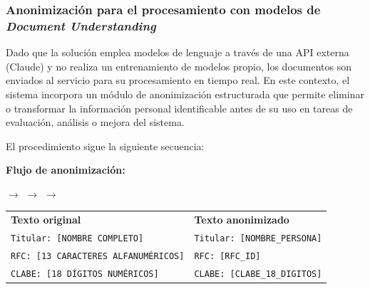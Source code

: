 \subsubsection{Anonimización para el procesamiento con modelos de \textit{Document Understanding}}

Dado que la solución emplea modelos de lenguaje a través de una API externa (Claude) y no realiza un entrenamiento de modelos propio, los documentos son enviados al servicio para su procesamiento en tiempo real. En este contexto, el sistema incorpora un módulo de anonimización estructurada \cite{google_docunderstanding} que permite eliminar o transformar la información personal identificable antes de su uso en tareas de evaluación, análisis o mejora del sistema.

El procedimiento sigue la siguiente secuencia:
\begin{tcolorbox}[
    colback=gray!5,
    colframe=gray!50,
    title={Proceso de anonimización implementado},
    fonttitle=\bfseries,
    sharp corners,
    boxrule=0.5pt
]
\small

\textbf{Flujo de anonimización:}

\begin{center}
$\rightarrow$
$\rightarrow$
$\rightarrow$
\end{center}

\vspace{6pt}

\begin{tabular}{ll}
\textbf{Texto original} & \textbf{Texto anonimizado} \\[6pt]

\texttt{Titular: [NOMBRE COMPLETO]} &
\texttt{Titular: [NOMBRE\_PERSONA]} \\

\texttt{RFC: [13 CARACTERES ALFANUMÉRICOS]} &
\texttt{RFC: [RFC\_ID]} \\

\texttt{CLABE: [18 DÍGITOS NUMÉRICOS]} &
\texttt{CLABE: [CLABE\_18\_DIGITOS]} \\
\end{tabular}

\vspace{4pt}



\end{tcolorbox}

